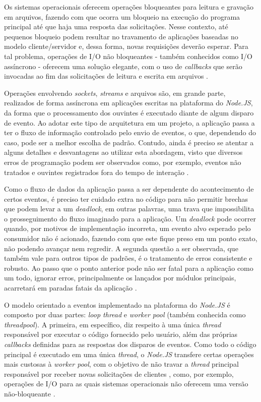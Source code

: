 \documentclass[12pt]{article}
\begin{document}
Os sistemas operacionais oferecem operações bloqueantes para leitura e gravação em arquivos, fazendo com que ocorra
um bloqueio na execução do programa principal até que haja uma resposta das solicitações. Nesse contexto, até pequenos
bloqueio podem resultar no travamento de aplicações baseadas no modelo cliente/servidor e, dessa forma, novas requisições
deverão esperar. Para tal problema, operações de I/O não bloqueantes - também conhecidos como I/O assíncrono - oferecem
uma solução elegante, com o uso de \textit{callbacks} que serão invocadas ao fim das solicitações 
de leitura e escrita em arquivos \cite{UDESC}.

Operações envolvendo \textit{sockets}, \textit{streams} e arquivos são, em grande parte, 
realizados de forma assíncrona em aplicações escritas na plataforma do \textit{Node.JS}, da forma que o processamento
dos ouvintes é executado diante de algum disparo de evento. \cite{MFO} Ao adotar este tipo de arquitetura em um projeto, 
a aplicação passa a ter o fluxo de informação controlado pelo envio de eventos, o que, dependendo do caso, pode ser a melhor 
escolha de padrão. Contudo, ainda é preciso se atentar a alguns detalhes e desvantagens ao utilizar esta abordagem,
visto que diversos erros de programação podem ser observados como, por exemplo, eventos não tratados e ouvintes
registrados fora do tempo de interação \cite[p. 28]{DIOGORESENDE}.

Como o fluxo de dados da aplicação passa a ser dependente do acontecimento de certos eventos, é preciso ter cuidado 
extra no código para não permitir brechas que podem levar a um \textit{deadlock},
em outras palavras, uma trava que impossibilita o prosseguimento do fluxo imaginado para a aplicação. Um 
\textit{deadlock} pode ocorrer quando, por motivos de implementação incorreta, um evento alvo esperado pelo
consumidor não é acionado, fazendo com que este fique preso em um ponto exato, não podendo avançar nem regredir.
A segunda questão a ser observada, que também vale para outros tipos de padrões, é o tratamento de erros consistente
e robusto. Ao passo que o ponto anterior pode não ser fatal para a aplicação como um todo, ignorar erros, principalmente
os lançados por módulos principais, acarretará em paradas fatais da aplicação \cite[p. 28]{DIOGORESENDE}.

O modelo orientado a eventos implementado na plataforma do \textit{Node.JS} é composto por duas partes: 
\textit{loop thread} e \textit{worker pool} (também conhecida como \textit{threadpool}). A primeira, em específico, 
diz respeito à uma única \textit{thread} responsável por executar o código fornecido pelo usuário, além 
das próprias \textit{callbacks} definidas para as respostas dos disparos de eventos. Como todo o código principal 
é executado em uma única \textit{thread}, o \textit{Node.JS} transfere certas operações mais custosas à \textit{worker pool}, 
com o objetivo de não travar a \textit{thread} principal responsável por receber novas solicitações de 
clientes \cite{BUGS} \cite{ATOMICITY}, 
como, por exemplo, operações de I/O para as quais sistemas operacionais não oferecem uma versão não-bloqueante 
\cite{NODEBLOCKEVENTLOOP}. 
\end{document}
